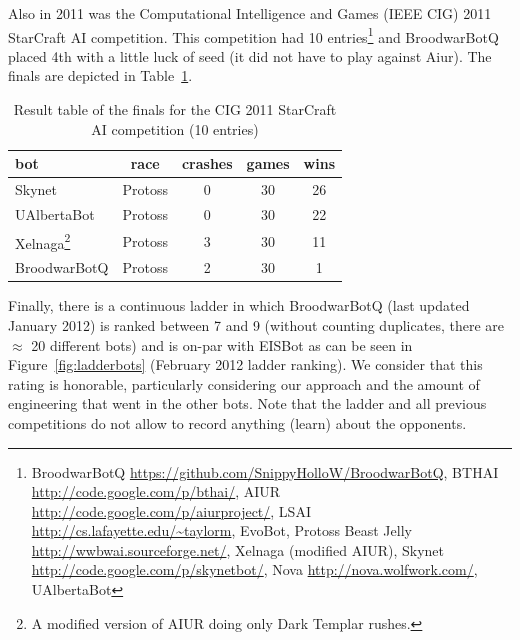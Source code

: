 Also in 2011 was the Computational Intelligence and Games (IEEE CIG) 2011 StarCraft AI competition. This competition had 10 entries\footnote{BroodwarBotQ \url{https://github.com/SnippyHolloW/BroodwarBotQ}, BTHAI \url{http://code.google.com/p/bthai/}, AIUR \url{http://code.google.com/p/aiurproject/}, LSAI \url{http://cs.lafayette.edu/~taylorm}, 
EvoBot, Protoss Beast Jelly \url{http://wwbwai.sourceforge.net/}, Xelnaga (modified AIUR), Skynet \url{http://code.google.com/p/skynetbot/}, Nova \url{http://nova.wolfwork.com/}, UAlbertaBot} and BroodwarBotQ placed 4th with a little luck of seed (it did not have to play against Aiur). The finals are depicted in Table~\ref{tab:botsCIG}.
\begin{table}[h]
    \begin{center}
    \begin{tabular}{|l|c|c|c|c|}
        \hline
bot & race & crashes & games & wins \\ 
        \hline
Skynet & Protoss & 0 & 30 & 26 \\ 
UAlbertaBot & Protoss & 0 & 30 &  22\\
Xelnaga\footnote{A modified version of AIUR doing only Dark Templar rushes.} & Protoss & 3 & 30 & 11 \\
BroodwarBotQ & Protoss & 2 & 30 & 1\\
        \hline
    \end{tabular}
    \end{center}
    \caption{Result table of the finals for the CIG 2011 StarCraft AI competition (10 entries)}
    \label{tab:botsCIG}
\end{table}

Finally, there is a continuous ladder in which BroodwarBotQ (last updated January 2012) is ranked between 7 and 9 (without counting duplicates, there are $\approx$ 20 different bots) and is on-par with EISBot \citep{WeberCIG10,Weber2010cr} as can be seen in Figure~\ref{fig:ladderbots} (February 2012 ladder ranking). We consider that this rating is honorable, particularly considering our approach and the amount of engineering that went in the other bots. Note that the ladder and all previous competitions do not allow to record anything (learn) about the opponents.

